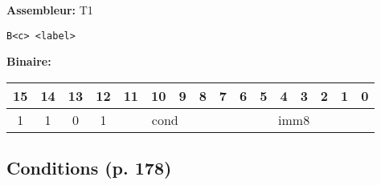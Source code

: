 \documentclass{article}
\begin{document}
    \textbf{Assembleur:} T1

    \begin{lstlisting}
B<c> <label>
    \end{lstlisting}

    \textbf{Binaire:}\\

    \begin{tabular}{| c c c c c c c c c c c c c c c c |}
        \hline
        15 & 14 & 13 & 12 & \multicolumn{1}{|c}{11} & 10 & 9 & 8 & \multicolumn{1}{|c}{7} & 6 & 5 & 4 & 3 & 2 & 1 & 0 \\
        \hline
        1 & 1 & 0 & 1 & \multicolumn{4}{|c}{cond} & \multicolumn{8}{|c|}{imm8} \\
        \hline
    \end{tabular}

    \subsection{Conditions (p. 178)}
    \label{subsec:CondFlags}
\end{document}
